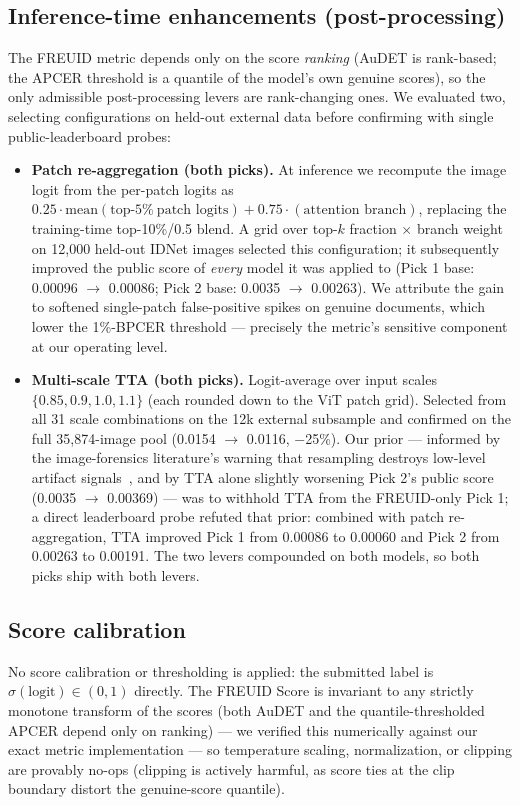 \documentclass[11pt,a4paper]{article}
\begin{document}
\subsection{Inference-time enhancements (post-processing)}
\label{sec:postproc}
The FREUID metric depends only on the score \emph{ranking} (AuDET is rank-based;
the APCER threshold is a quantile of the model's own genuine scores), so the only
admissible post-processing levers are rank-changing ones. We evaluated two,
selecting configurations on held-out external data before confirming with single
public-leaderboard probes:

\begin{itemize}[noitemsep]
  \item \textbf{Patch re-aggregation (both picks).} At inference we recompute the
    image logit from the per-patch logits as
    $0.25\cdot\mathrm{mean}(\text{top-}5\%\ \text{patch logits}) +
    0.75\cdot(\text{attention branch})$, replacing the training-time top-10\%/0.5
    blend. A grid over top-$k$ fraction $\times$ branch weight on 12{,}000
    held-out IDNet images selected this configuration; it subsequently improved
    the public score of \emph{every} model it was applied to (Pick 1 base:
    0.00096 $\rightarrow$ 0.00086; Pick 2 base: 0.0035 $\rightarrow$ 0.00263). We
    attribute the gain to softened single-patch false-positive spikes on genuine
    documents, which lower the 1\%-BPCER threshold --- precisely the metric's
    sensitive component at our operating level.
  \item \textbf{Multi-scale TTA (both picks).} Logit-average over input scales
    $\{0.85, 0.9, 1.0, 1.1\}$ (each rounded down to the ViT patch grid). Selected
    from all 31 scale combinations on the 12k external subsample and confirmed on
    the full 35{,}874-image pool (0.0154 $\rightarrow$ 0.0116, $-$25\%). Our prior
    --- informed by the image-forensics literature's warning that resampling
    destroys low-level artifact signals~\cite{deepid2025}, and by TTA alone
    slightly worsening Pick 2's public score (0.0035 $\rightarrow$ 0.00369) ---
    was to withhold TTA from the FREUID-only Pick 1; a direct leaderboard probe
    refuted that prior: combined with patch re-aggregation, TTA improved Pick 1
    from 0.00086 to 0.00060 and Pick 2 from 0.00263 to 0.00191. The two levers
    compounded on both models, so both picks ship with both levers.
\end{itemize}

\subsection{Score calibration}
\label{sec:calibration}
No score calibration or thresholding is applied: the submitted label is
$\sigma(\text{logit})\in(0,1)$ directly. The FREUID Score is invariant to any
strictly monotone transform of the scores (both AuDET and the
quantile-thresholded APCER depend only on ranking) --- we verified this
numerically against our exact metric implementation --- so temperature scaling,
normalization, or clipping are provably no-ops (clipping is actively harmful, as
score ties at the clip boundary distort the genuine-score quantile).
\end{document}
